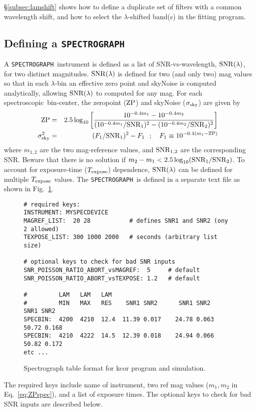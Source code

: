 \documentclass[12pt]{article}
\newcommand{\SPEC}{{\tt SPECTROGRAPH}}
\newcommand{\SNRlam}{{\rm SNR}(\lambda)}
\newcommand{\Texpose}{T_{\rm expose}}
\newcommand{\ZP}{{\rm ZP}}
\newcommand{\sigSky}{\sigma_{\rm sky}}
\newcommand{\spec}{spectroscopic}
\newcommand{\lam}{\lambda}
\begin{document}
{\S\ref{subsec:lamshift} shows how to define a duplicate set
of filters with a common wavelength shift, and how to select
the $\lambda$-shifted band(s) in the fitting program.


   \clearpage
\subsection{Defining a {\SPEC} }
\label{subsec:kcor_spectrograph}


A \SPEC\ instrument is defined as a list of SNR-vs-wavelength,
$\SNRlam$, for two distinct magnitudes. 
$\SNRlam$ is defined for two (and only two) mag values so that in each
$\lam$-bin an effective zero point and skyNoise is 
computed analytically, allowing $\SNRlam$ to computed for any mag.
For each \spec\ bin-center, the zeropoint ($\ZP$) and skyNoise ($\sigSky$) 
are given by
%
\begin{eqnarray}
   \ZP & = &
      2.5\log_{10}\left[ \frac{  10^{-0.4m_1} - 10^{-0.4m_2} }
           {  (10^{-0.4m_1}/{\rm SNR}_1)^2 - (10^{-0.4m_2}/{\rm SNR}_2)^2 }
      \right]
     \\
   \sigSky^2 & = & (F_1/{\rm SNR}_1)^2 - F_1 ~~ ; ~~~ 
            F_1 \equiv 10^{-0.4(m_1-\ZP)}
  \label{eq:ZPspec}
\end{eqnarray}
%
where $m_{1,2}$ are the two mag-reference values,
and ${\rm SNR}_{1,2}$ are the corresponding SNR.
Beware that there is no solution if
$m_2-m_1 < 2.5\log_{10}({\rm SNR}_1/{\rm SNR}_2)$.
%
To account for exposure-time ($\Texpose$) dependence, 
$\SNRlam$ can be defined for multiple $\Texpose$ values.
The \SPEC\ is defined in a separate text file as shown 
in Fig.~\ref{fig:spectro_table}.
%
\begin{figure} [ht] 
\begin{center}
\begin{Verbatim}[frame=single]
# required keys:
INSTRUMENT: MYSPECDEVICE
MAGREF_LIST:  20 28           # defines SNR1 and SNR2 (ony 2 allowed)
TEXPOSE_LIST: 300 1000 2000   # seconds (arbitrary list size)

# optional keys to check for bad SNR inputs
SNR_POISSON_RATIO_ABORT_vsMAGREF:  5     # default
SNR_POISSON_RATIO_ABORT_vsTEXPOSE: 1.2   # default

#         LAM   LAM   LAM
#         MIN   MAX   RES    SNR1 SNR2      SNR1 SNR2      SNR1 SNR2
SPECBIN:  4200  4210  12.4  11.39 0.017    24.78 0.063    50.72 0.168   
SPECBIN:  4210  4222  14.5  12.39 0.018    24.94 0.066    50.82 0.172   
etc ...
\end{Verbatim}
\end{center}
\caption{
  Spectrograph table format for kcor program and simulation.
 }
\label{fig:spectro_table}
\end{figure}
%
The required keys include name of instrument,
two ref mag values ($m_1,m_2$ in Eq.~\ref{eq:ZPspec}),
and a list of exposure times. The optional keys to 
check for bad SNR inputs are described below.

}
\end{document}
